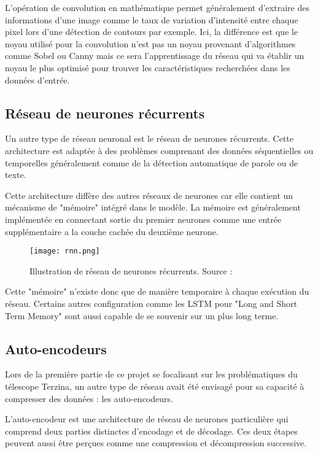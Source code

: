 L'opération de convolution en mathématique permet généralement d'extraire des informations d'une image comme le taux de 
variation d'intensité entre chaque pixel lors d'une détection de contours par exemple.
Ici, la différence est que le noyau utilisé pour la convolution n'est pas un noyau provenant d'algorithmes comme Sobel ou Canny mais ce sera
l'apprentissage du réseau qui va établir un noyau le plus optimisé pour trouver les caractéristiques recherchées dans les données d'entrée.

\subsection{Réseau de neurones récurrents}

Un autre type de réseau neuronal est le réseau de neurones récurrents. Cette architecture est adaptée
à des problèmes comprenant des données séquentielles ou temporelles généralement comme de la détection automatique de parole ou de texte.

Cette architecture diffère des autres réseaux de neurones car elle contient un mécanisme de "mémoire" intégré dans le modèle.
La mémoire est généralement implémentée en connectant sortie du premier neurones comme une entrée supplémentaire a la couche cachée du deuxième neurone.

\begin{figure}[tbph!]
	\centering
	\texttt{[image: rnn.png]}
	\caption[Illustration de réseau de neurones récurrents]{Illustration de réseau de neurones récurrents. Source : \cite{RnnImage}}
\end{figure}

Cette "mémoire" n'existe donc que de manière temporaire à chaque exécution du réseau. Certains autres configuration comme les LSTM pour "Long and Short Term Memory"
sont aussi capable de se souvenir sur un plus long terme.

\subsection{Auto-encodeurs}

Lors de la première partie de ce projet se focalisant sur les problématiques du télescope Terzina, un autre type de réseau 
avait été envisagé pour sa capacité à compresser des données : les auto-encodeurs.

L'auto-encodeur est une architecture de réseau de neurones particulière qui comprend deux parties distinctes d'encodage et de décodage. 
Ces deux étapes peuvent aussi être perçues comme une compression et décompression successive. \cite{IbmAutoencoder}

